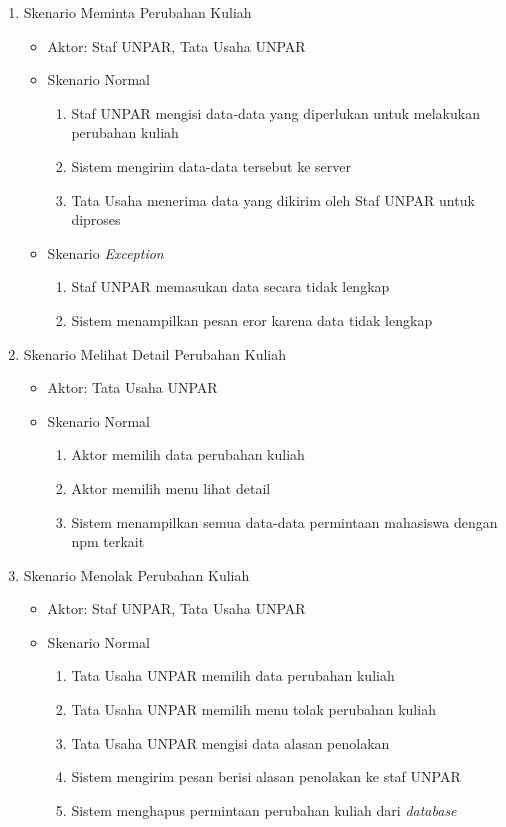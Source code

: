 \begin{enumerate}
	\item Skenario Meminta Perubahan Kuliah
	\begin{itemize}
		\item Aktor: Staf UNPAR, Tata Usaha UNPAR
		\item Skenario Normal
			\begin{enumerate}[1.]
				\item Staf UNPAR mengisi data-data yang diperlukan untuk melakukan perubahan kuliah
				\item Sistem mengirim data-data tersebut ke server 
				\item Tata Usaha menerima data yang dikirim oleh Staf UNPAR untuk diproses
			\end{enumerate}
		\item Skenario \textit{Exception}
			\begin{enumerate}[1.]
			 	\item Staf UNPAR memasukan data secara tidak lengkap
			 	\item Sistem menampilkan pesan eror karena data tidak lengkap
			\end{enumerate}
	\end{itemize}


	\item Skenario Melihat Detail Perubahan Kuliah
	\begin{itemize}
		\item Aktor: Tata Usaha UNPAR
		\item Skenario Normal
			\begin{enumerate}[1.]
				\item Aktor memilih data perubahan kuliah 
				\item Aktor memilih menu lihat detail
				\item Sistem menampilkan semua data-data permintaan mahasiswa dengan npm terkait 
			\end{enumerate}
	\end{itemize}
	
	\item Skenario Menolak Perubahan Kuliah 
	\begin{itemize}
		\item Aktor: Staf UNPAR, Tata Usaha UNPAR
		\item Skenario Normal
			\begin{enumerate}[1.]
				\item Tata Usaha UNPAR memilih data perubahan kuliah 
				\item Tata Usaha UNPAR memilih menu tolak perubahan kuliah
				\item Tata Usaha UNPAR mengisi data alasan penolakan
				\item Sistem mengirim pesan berisi alasan penolakan ke staf UNPAR
				\item Sistem menghapus permintaan perubahan kuliah dari \textit{database}
			\end{enumerate}
	\end{itemize}
	

\end{enumerate}
